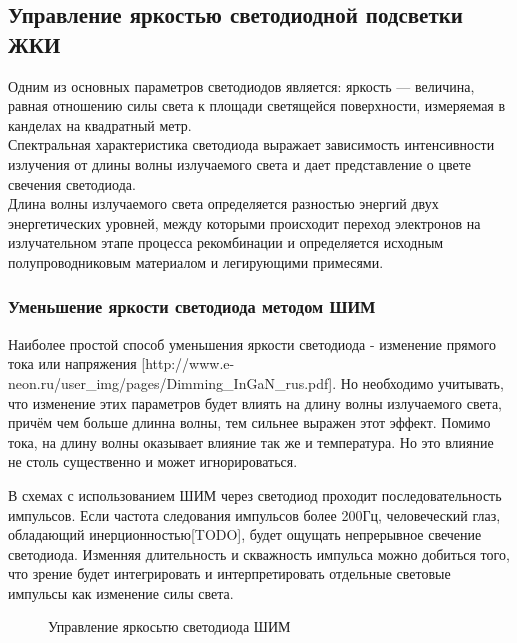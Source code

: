\subsection{Управление яркостью светодиодной подсветки ЖКИ}

\begin{par}
Одним из основных параметров светодиодов является: яркость — величина,
равная отношению силы света к площади светящейся
поверхности, измеряемая в канделах на квадратный метр. \\

Спектральная характеристика светодиода выражает зависимость интенсивности
излучения от длины волны излучаемого света и дает представление о цвете
свечения светодиода. \\

Длина волны излучаемого света определяется разностью
энергий двух энергетических уровней, между которыми происходит переход
электронов на излучательном этапе процесса рекомбинации и определяется
исходным полупроводниковым материалом и легирующими примесями.
\end{par}

\subsubsection{Уменьшение яркости светодиода методом ШИМ}

\begin{par}
Наиболее простой способ уменьшения яркости светодиода - изменение прямого
тока или напряжения [http://www.e-neon.ru/user_img/pages/Dimming_InGaN_rus.pdf].
Но необходимо учитывать, что изменение этих параметров будет влиять на
длину волны излучаемого света, причём чем больше длинна волны, тем сильнее
выражен этот эффект.
Помимо тока, на длину волны оказывает влияние так же и температура.
Но это влияние не столь существенно и может игнорироваться.
\end{par}

\begin{par}
В схемах с использованием ШИМ через светодиод проходит последовательность импульсов.
Если частота следования импульсов более 200Гц, человеческий
глаз, обладающий инерционностью[TODO], будет ощущать непрерывное свечение
светодиода. Изменняя длительность и скважность импульса можно добиться того,
что зрение будет интегрировать и интерпретировать отдельные световые импульсы
как изменение силы света.
\end{par}

\begin{figure}[h]
	\caption{Управление яркосьтю светодиода ШИМ}
	\label{img:led_pwm}
\end{figure}

